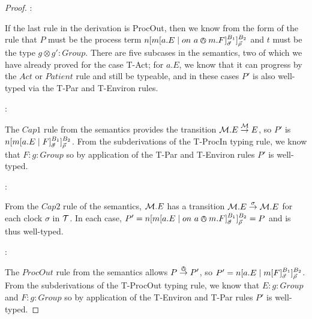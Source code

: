 \begin{proof}
:

\noindent If the last rule in the derivation is ProcOut, then we know
from the form of the rule that $P$ must be the process term
${n}[ {m}[ a.E \;|\;
    on\ a \varowedge m.F ]^{B_1}_{\vec{\sigma}} ]^{B_2}_{\vec{\rho}}$ and $t$
must be the type $g \otimes g': Group$.  There are five subcases in
the semantics, two of which we have already proved for the case T-Act;
for $a.E$, we know that it can progress by the $Act$ or $Patient$ rule
and still be typeable, and in these cases $P'$ is also well-typed via
the T-Par and T-Environ rules.

:

\noindent The $Cap1$ rule from the semantics provides the transition
$\text{$\mathcal{M}$}.E \stackrel{\text{$\mathcal{M}$}}{\rightarrow} E$, so $P'$ is ${n}[ {m}[ a.E \;|\;
    F ]^{B_1}_{\vec{\sigma}} ]^{B_2}_{\vec{\rho}}$.  From the subderivations
of the T-ProcIn typing rule, we know that $F : g : Group$ so by
application of the T-Par and T-Environ rules $P'$ is well-typed.

:

\noindent From the $Cap2$ rule of the semantics, $\text{$\mathcal{M}$}.E$ has a
transition $\text{$\mathcal{M}$}.E \stackrel{\sigma}{\rightarrow} \text{$\mathcal{M}$}.E$ for each clock
$\sigma$ in $\text{$\mathcal{T}$}$.  In each case, $P' = {n}[ {m}[ a.E \;|\;
    on\ a \varowedge m.F ]^{B_1}_{\vec{\sigma}} ]^{B_2}_{\vec{\rho}} = P$ and is
thus well-typed.

:

\noindent The $ProcOut$ rule from the semantics allows $P
\stackrel{\varowedge}{\rightarrow} P'$, so $P' = {n}[ a.E \;|\;
  {m}[ F ]^{B_1}_{\vec{\sigma}} ]^{B_2}_{\vec{\rho}}$.  From the
subderivations of the T-ProcOut typing rule, we know that $E : g :
Group$ and $F : g : Group$ so by application of the T-Environ and
T-Par rules $P'$ is well-typed.

\end{proof}

